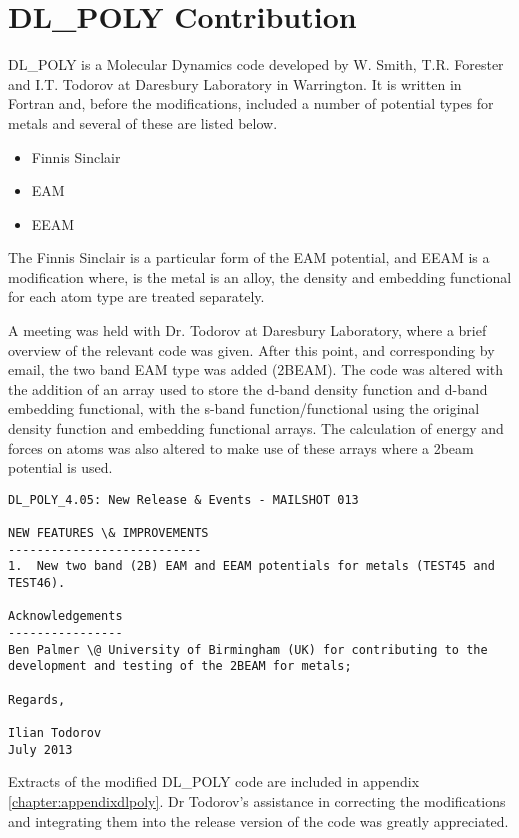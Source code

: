 
\FloatBarrier
\section{DL\_POLY Contribution}
\label{section:dlpoly}

DL\_POLY is a Molecular Dynamics code developed by W. Smith, T.R. Forester and I.T. Todorov at Daresbury Laboratory in Warrington. It is written in Fortran and, before the modifications, included a number of potential types for metals and several of these are listed below.

\begin{itemize}
\item Finnis Sinclair
\item EAM
\item EEAM
\end{itemize}

The Finnis Sinclair is a particular form of the EAM potential, and EEAM is a modification where, is the metal is an alloy, the density and embedding functional for each atom type are treated separately.

A meeting was held with Dr. Todorov at Daresbury Laboratory, where a brief overview of the relevant code was given.  After this point, and corresponding by email, the two band EAM type was added (2BEAM).  The code was altered with the addition of an array used to store the d-band density function and d-band embedding functional, with the s-band function/functional using the original density function and embedding functional arrays.  The calculation of energy and forces on atoms was also altered to make use of these arrays where a \acrlong{2beam} potential is used.

\begin{lstlisting}[style=sEmail,caption={DL\_POLY 4.05 mailshot extract}]
DL_POLY_4.05: New Release & Events - MAILSHOT 013

NEW FEATURES \& IMPROVEMENTS
--------------------------- 
1.  New two band (2B) EAM and EEAM potentials for metals (TEST45 and TEST46). 

Acknowledgements
----------------
Ben Palmer \@ University of Birmingham (UK) for contributing to the
development and testing of the 2BEAM for metals;

Regards,

Ilian Todorov
July 2013 
\end{lstlisting}

Extracts of the modified DL\_POLY code are included in appendix \ref{chapter:appendixdlpoly}.  Dr Todorov's assistance in correcting the modifications and integrating them into the release version of the code was greatly appreciated.


